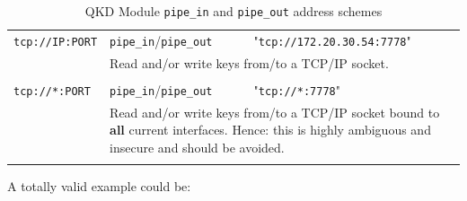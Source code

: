 \begin{table}[h!]
\begin{tabular}{llp{8cm}}
    \\
    \texttt{tcp://IP:PORT}  &   \texttt{pipe\_in}/\texttt{pipe\_out}    &  "\texttt{tcp://172.20.30.54:7778}" \\ [0.7em]
    & \multicolumn{2}{p{11cm}}{Read and/or write keys from/to a TCP/IP socket.}\\ [0.7em]    
    \\
    \texttt{tcp://*:PORT}   &   \texttt{pipe\_in}/\texttt{pipe\_out}    &  "\texttt{tcp://*:7778}"            \\ [0.7em]
    & \multicolumn{2}{p{11cm}}{Read and/or write keys from/to a TCP/IP socket bound to \textbf{all} current interfaces. Hence: this is highly ambiguous and insecure and should be avoided.}\\ [0.7em]    
    \\
    \end{tabular}
    \caption{QKD Module \texttt{pipe\_in} and \texttt{pipe\_out} address schemes}
    \label{tab:QKD Module pipe-in and pipe-out address schemes}
\end{table}

\medskip

A totally valid example could be:

